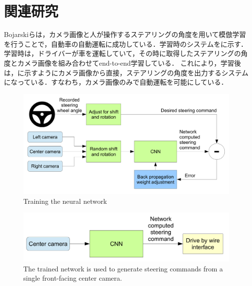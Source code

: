 
\section{関連研究}
     Bojarskiら\cite{bojarski}は，カメラ画像と人が操作するステアリングの角度を用いて模倣学習を行うことで，自動車の自動運転に成功している．学習時のシステムをに示す．学習時は，ドライバーが車を運転していて，その時に取得したステアリングの角度とカメラ画像を組み合わせてend-to-end学習している．
     これにより，学習後は，に示すようにカメラ画像から直接，ステアリングの角度を出力するシステムになっている．すなわち，カメラ画像のみで自動運転を可能にしている．
     
     \begin{figure}[h]
          \centering
          \includegraphics[keepaspectratio, scale=0.16] {images/bojarski_train.png}
          \caption{Training the neural network \cite{bojarski}}
          \label{Fig:bojarski_train}
     \end{figure}



     \begin{figure}[h]
          \centering
          \includegraphics[keepaspectratio, scale=0.20] {images/bojarski_test.png}
          \captionsetup{justification=raggedright} %
          \caption{The trained network is used to generate steering commands from a single front-facing center camera. \cite{bojarski}}
          \label{Fig:bojarski_test}
     \end{figure}

